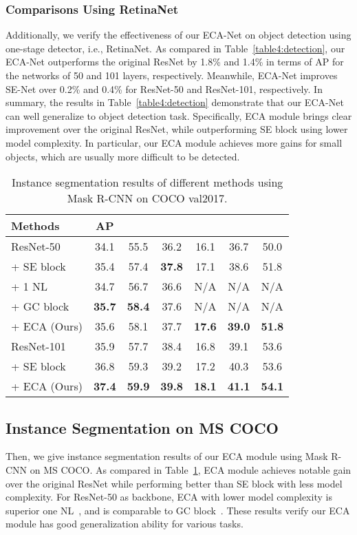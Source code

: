 \documentclass[10pt,twocolumn,letterpaper]{article}
\begin{document}
\vspace{-0.3cm}
\subsubsection{Comparisons Using RetinaNet}
Additionally, we verify the effectiveness of our ECA-Net on object detection using one-stage detector, i.e., RetinaNet.  As compared in Table~\ref{table4:detection}, our ECA-Net outperforms the original ResNet by 1.8\% and 1.4\% in terms of AP for the networks of 50 and 101 layers, respectively. Meanwhile, ECA-Net improves SE-Net over 0.2\% and 0.4\%  for ResNet-50 and ResNet-101, respectively. In summary, the results in Table~\ref{table4:detection} demonstrate that our ECA-Net can well generalize to object detection task. Specifically, ECA module brings clear improvement over the original ResNet, while outperforming  SE block using lower model complexity. In particular, our ECA module achieves more gains for small objects, which are usually more difficult to be detected.  

\begin{table}[t]
	\centering
\footnotesize
	\renewcommand{\arraystretch}{1.2}
	\begin{tabular}{l|c|c|c|c|c|c}
		\hline
		Methods  & AP &  &  &  &  & \\
		\hline
		ResNet-50  & 34.1 & 55.5 & 36.2 & 16.1 & 36.7 & 50.0 \\
		+ SE block & 35.4 & 57.4 & \textbf{37.8} & 17.1 & 38.6 & 51.8 \\
		+ 1 NL  & 34.7 & 56.7  & 36.6 & N/A & N/A & N/A \\
		+ GC block & \textbf{35.7}   & \textbf{58.4}  & 37.6 & N/A & N/A & N/A \\
		+ ECA (Ours) & 35.6 & 58.1 & 37.7 & \textbf{17.6} & \textbf{39.0} & \textbf{51.8} \\
		\hline
		ResNet-101 & 35.9 & 57.7 & 38.4 & 16.8 & 39.1 & 53.6 \\
		+ SE block  & 36.8 & 59.3 & 39.2 & 17.2 & 40.3 & 53.6 \\
		+ ECA (Ours) & \textbf{37.4} & \textbf{59.9} & \textbf{39.8} & \textbf{18.1} & \textbf{41.1} & \textbf{54.1} \\
		\hline
	\end{tabular}
	\smallskip
	\caption{Instance segmentation results of different methods using Mask R-CNN on COCO val2017.}
	\label{table:instance}
\end{table}

\subsection{Instance Segmentation on MS COCO}	
Then, we give instance segmentation results of our ECA module using Mask R-CNN on MS COCO. As compared in Table~\ref{table:instance}, ECA module achieves notable gain over the original ResNet while performing better than SE block with less model complexity. For ResNet-50 as backbone, ECA with lower model complexity is superior one NL~\cite{Wang_2018_CVPR}, and is comparable to GC block~\cite{Cao_2019_ICCV_Workshops}. These results verify our ECA module has good generalization ability for various tasks. 
\end{document}

